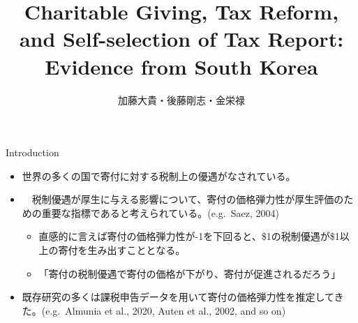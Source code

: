 \documentclass[dvipdfmx,10pt]{beamer}
\begin{document}
	\author{加藤大貴・後藤剛志・金栄禄}
	\title{Charitable Giving, Tax Reform, and Self-selection of Tax Report:
		Evidence from South Korea}
	\begin{frame}[plain]
		\maketitle
	\end{frame}
	
	\begin{frame}{Introduction}
		\protect\hypertarget{introduction}{}
		\begin{itemize}
			\item 世界の多くの国で寄付に対する税制上の優遇がなされている。
			\item　税制優遇が厚生に与える影響について、寄付の価格弾力性が厚生評価のための重要な指標であると考えられている。(e.g.~Saez, 2004)
			\begin{itemize}
				\item 直感的に言えば寄付の価格弾力性が-1を下回ると、\$1の税制優遇が\$1以上の寄付を生み出すこととなる。
				\item 「寄付の税制優遇で寄付の価格が下がり、寄付が促進されるだろう」
			\end{itemize}
			\item 既存研究の多くは課税申告データを用いて寄付の価格弾力性を推定してきた。(e.g.~Almunia et al., 2020, Auten et al., 2002, and so on)
		\end{itemize}
	\end{frame}
	
\end{document}

